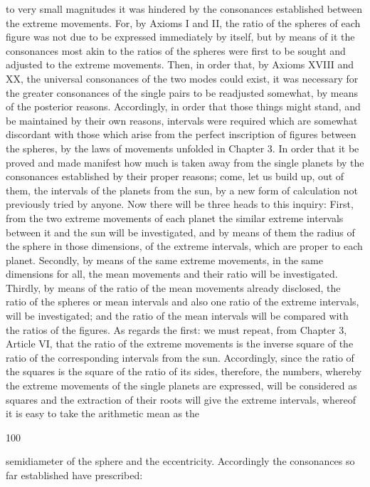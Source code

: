 \documentclass{article}
\begin{document}
to very small magnitudes it was hindered by the consonances
established between the extreme movements.
For, by Axioms I and II, the ratio of the spheres of each figure was not
due to be expressed immediately by itself, but by means of it the
consonances most akin to the ratios of the spheres were first to be sought
and adjusted to the extreme movements.
Then, in order that, by Axioms XVIII and XX, the universal consonances
of the two modes could exist, it was necessary for the greater
consonances of the single pairs to be readjusted somewhat, by means of
the posterior reasons. Accordingly, in order that those things might
stand, and be maintained by their own reasons, intervals were required
which are somewhat discordant with those which arise from the perfect
inscription of figures between the spheres, by the laws of movements
unfolded in Chapter 3. In order that it be proved and made manifest how
much is taken away from the single planets by the consonances
established by their proper reasons; come, let us build up, out of them,
the intervals of the planets from the sun, by a new form of calculation
not previously tried by anyone.
Now there will be three heads to this inquiry: First, from the two extreme
movements of each planet the similar extreme intervals between it and
the sun will be investigated, and by means of them the radius of the
sphere in those dimensions, of the extreme intervals, which are proper to
each planet. Secondly, by means of the same extreme movements, in the
same dimensions for all, the mean movements and their ratio will be
investigated. Thirdly, by means of the ratio of the mean movements
already disclosed, the ratio of the spheres or mean intervals and also one
ratio of the extreme intervals, will be investigated; and the ratio of the
mean intervals will be compared with the ratios of the figures.
As regards the first: we must repeat, from Chapter 3, Article VI, that the
ratio of the extreme movements is the inverse square of the ratio of the
corresponding intervals from the sun. Accordingly, since the ratio of the
squares is the square of the ratio of its sides, therefore, the numbers,
whereby the extreme movements of the single planets are expressed, will
be considered as squares and the extraction of their roots will give the
extreme intervals, whereof it is easy to take the arithmetic mean as the


100

semidiameter of the sphere and the eccentricity. Accordingly the
consonances so far established have prescribed:
\end{document}
